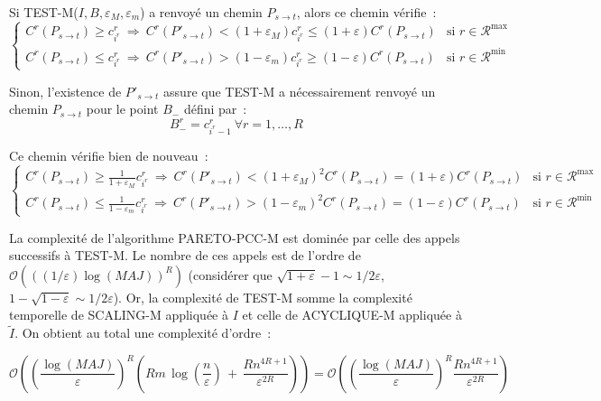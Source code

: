 \documentclass[10pt,francais]{llncs}
\begin{document}
{Si TEST-M($I,B,\varepsilon_M,\varepsilon_m$) a renvoy\'e un chemin $P_{s \to t}$, alors ce chemin v\'erifie~:
$$\left\{\begin{array}{ll}
C^r(P_{s \to t})\geq c^r_{i^r}\ \Rightarrow\ C^r(P'_{s \to t})< (1+\varepsilon_M)c^r_{i^r}\leq (1+\varepsilon)C^r(P_{s \to t}) 
&\textrm{si }r\in \mathscr{R}^{\max}\\[7pt]
C^r(P_{s \to t})\leq c^r_{i^r}\ \Rightarrow\ C^r(P'_{s \to t})> (1-\varepsilon_m)c^r_{i^r}\geq (1-\varepsilon)C^r(P_{s \to t}) 
&\textrm{si }r\in \mathscr{R}^{\min}
\end{array}\right.$$

Sinon, l'existence de $P'_{s \to t}$ assure que TEST-M a n\'ecessairement renvoy\'e un chemin $P_{s \to t}$ pour le point $B_{-}$ d\'efini par~:
$$B_{-}^r= c^r_{i^r-1}\ \forall r=1,\ldots,R$$

Ce chemin v\'erifie bien de nouveau~:
$$\left\{\begin{array}{ll}
C^r(P_{s \to t})\geq \frac{1}{1+\varepsilon_M}c^r_{i^r}\ \Rightarrow\ C^r(P'_{s \to t})< (1+\varepsilon_M)^2C^r(P_{s \to t})= (1+\varepsilon)C^r(P_{s \to t}) &\textrm{si }r\in \mathscr{R}^{\max}\\[7pt]
C^r(P_{s \to t})\leq \frac{1}{1-\varepsilon_m}c^r_{i^r}\ \Rightarrow\ C^r(P'_{s \to t})> (1-\varepsilon_m)^2C^r(P_{s \to t})= (1-\varepsilon)C^r(P_{s \to t}) &\textrm{si }r\in \mathscr{R}^{\min}
\end{array}\right.$$

La complexit\'e de l'algorithme PARETO-PCC-M est domin\'ee par celle des appels successifs \`a TEST-M. Le nombre de ces appels est de l'ordre de $\mathcal{O}\left(\left((1/\varepsilon)\log(MAJ)\right)^R\right)$ (consid\'erer que $\sqrt{1+\varepsilon}-1\sim 1/2\varepsilon$, $1-\sqrt{1-\varepsilon}\sim 1/2\varepsilon$). Or, la complexit\'e de TEST-M somme la complexit\'e temporelle de SCALING-M appliqu\'ee \`a $I$ et celle de ACYCLIQUE-M appliqu\'ee \` a $\tilde{I}$.
On obtient au total une complexit\'e d'ordre~:

$$\mathcal{O}\left( \left(\frac{\log(MAJ)}{\varepsilon}\right)^R 
			\left(Rm\, \log\left(\frac{n}{\varepsilon}\right)\, +\, \frac{Rn^{4R+1}}{\varepsilon^{2R}}\right)\right)
			=\mathcal{O}\left( \left(\frac{\log(MAJ)}{\varepsilon}\right)^R \frac{Rn^{4R+1}}{\varepsilon^{2R}}\right)	$$
	
}
\end{document}
